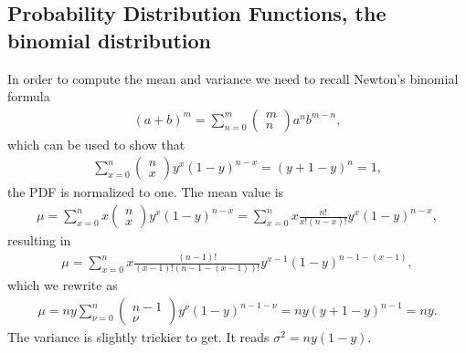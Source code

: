 \documentclass[letterpaper,10pt,english]{sphinxmanual}
\begin{document}
\subsection{Probability Distribution Functions, the binomial distribution}
\label{\detokenize{chapter2:probability-distribution-functions-the-binomial-distribution}}
In order to compute the mean and variance we need to recall Newton’s binomial
formula
\begin{equation*}
\begin{split}
(a+b)^m=\sum_{n=0}^m \left(\begin{array}{c} m \\ n\end{array}\right)a^nb^{m-n},
\end{split}
\end{equation*}
which can be used to show that
\begin{equation*}
\begin{split}
\sum_{x=0}^n\left(\begin{array}{c} n \\ x\end{array}\right)y^x(1-y)^{n-x} = (y+1-y)^n = 1,
\end{split}
\end{equation*}
the PDF is normalized to one.
The mean value is
\begin{equation*}
\begin{split}
\mu = \sum_{x=0}^n x\left(\begin{array}{c} n \\ x\end{array}\right)y^x(1-y)^{n-x} =
\sum_{x=0}^n x\frac{n!}{x!(n-x)!}y^x(1-y)^{n-x},
\end{split}
\end{equation*}
resulting in
\begin{equation*}
\begin{split}
\mu = 
\sum_{x=0}^n x\frac{(n-1)!}{(x-1)!(n-1-(x-1))!}y^{x-1}(1-y)^{n-1-(x-1)},
\end{split}
\end{equation*}
which we rewrite as
\begin{equation*}
\begin{split}
\mu=ny\sum_{\nu=0}^n\left(\begin{array}{c} n-1 \\ \nu\end{array}\right)y^{\nu}(1-y)^{n-1-\nu} =ny(y+1-y)^{n-1}=ny.
\end{split}
\end{equation*}
The variance is slightly trickier to get. It reads \(\sigma^2=ny(1-y)\).
\end{document}
